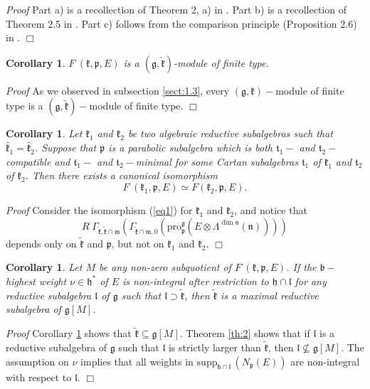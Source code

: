 \documentclass[10pt]{amsart}
\newtheorem{cor}[theo]{Corollary}
\renewenvironment{proof}{ \emph{Proof}}{$\Box$}
\newcommand{\supp}{\mathrm{supp}}
\newcommand{\pro}{\mathrm{pro}}
\newcommand{\bb}{\mathfrak{b}}
\renewcommand{\gg}{\mathfrak{g}}
\newcommand{\hh}{\mathfrak{h}}
\newcommand{\kk}{\mathfrak{k}}
\renewcommand{\ll}{\mathfrak{l}}
\newcommand{\mm}{\mathfrak{m}}
\newcommand{\nn}{\mathfrak{n}}
\newcommand{\pp}{\mathfrak{p}}
\renewcommand{\tt}{\mathfrak{t}}
\begin{document}
\begin{proof}
	Part a) is a recollection of Theorem 2, a) in \cite{PZ2}. Part b) is a recollection of Theorem 2.5 in \cite{PZ5}. Part c) follows from the comparison principle (Proposition $2.6$) in \cite{PZ4}.
\end{proof}

\begin{cor}\label{corr:3}
    $F^\cdot(\kk,\pp,E)$ is a $(\gg,\tilde{\kk})$-module of finite type.
\end{cor}

\begin{proof}
    As we observed in subsection \ref{sect:1.3}, every $(\gg,\kk)-$module of finite type is a $(\gg,\tilde{\kk})-$module of finite type.
\end{proof}

\begin{cor}\label{corr:4}
    Let $\kk_1$ and $\kk_2$ be two algebraic reductive subalgebras such that $\tilde{\kk_1}=\tilde{\kk_2}$. Suppose that $\pp$ is a parabolic subalgebra which is both $\tt_1-$ and $\tt_2-$compatible and  $\tt_1-$ and $\tt_2-$minimal for some Cartan subalgebras $\tt_1$ of $\kk_1$ and $\tt_2$ of $\kk_2$. Then there exists a canonical isomorphism
	$$F^\cdot(\kk_1,\pp,E)\simeq F(\kk_2,\pp,E).$$
\end{cor}

\begin{proof}
    Consider the isomorphism (\ref{eq1}) for $\kk_1$ and $\kk_2$, and notice that $$R^\cdot\Gamma_{\tilde{\kk},\tilde{\kk}\cap\mm}(\Gamma_{\tilde{\kk}\cap\mm,0}(\pro_\pp^\gg (E\otimes \Lambda^{\dim \nn}(\nn))))$$ depends only on $\tilde{\kk}$ and $\pp$, but not on $\kk_1$ and $\kk_2$.
\end{proof}

\begin{cor}\label{corr:5}
 Let $M$ be any non-zero subquotient of $F^{\cdot}(\kk,\pp,E)$. If the $\bb-$highest weight $\nu \in \hh^*$ of $E$ is non-integral after restriction to $\hh \cap \ll$ for any reductive subalgebra $\ll$ of $\gg$ such that $\ll \supset \tilde{\kk}$, then $\tilde{\kk}$ is a maximal reductive subalgebra of $\gg[M]$.
\end{cor}

\begin{proof}
 Corollary \ref{corr:3} shows that $\tilde{\kk} \subseteq \gg[M]$. Theorem \ref{th:2} shows that if $\ll$ is a reductive subalgebra of $\gg$ such that $\ll$ is strictly larger than $\tilde{\kk}$, then $\ll \nsubseteq \gg[M]$. The assumption on $\nu$ implies that all weights in $\supp_{\hh \cap \ll}\,(N_{\pp}(E))$ are non-integral with respect to $\ll$.   
\end{proof}
\end{document}
